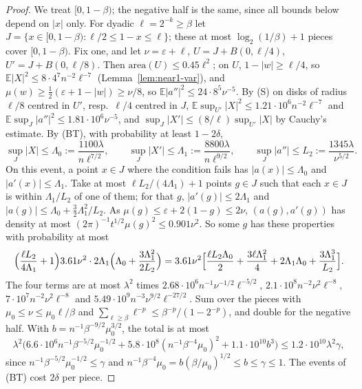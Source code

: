 \documentclass[11pt]{amsart}
\theoremstyle{definition}
\theoremstyle{remark}
\numberwithin{equation}{section}
\newcommand{\E}{\mathbb{E}}
\newcommand{\eps}{\varepsilon}
\begin{document}
\begin{proof}
We treat $[0,1-\beta)$; the negative half is the same, since all bounds below depend on $|x|$ only. For dyadic $\ell=2^{-k}\ge\beta$ let $J=\{x\in[0,1-\beta):\ell/2\le1-x\le\ell\}$; these at most $\log_2(1/\beta)+1$ pieces cover $[0,1-\beta)$. Fix one, and let $\nu=\eps+\ell$, $U=J+B(0,\ell/4)$, $U'=J+B(0,\ell/8)$. Then $\mathrm{area}(U)\le0.45\ell^2$; on $U$, $1-|w|\ge\ell/4$, so $\E|X|^2\le8\cdot4^7n^{-2}\ell^{-7}$ (Lemma~\ref{lem:near1-var}), and $\mu(w)\ge\frac12(\eps+1-|w|)\ge\nu/8$, so $\E|a''|^2\le24\cdot8^5\nu^{-5}$. By (S) on disks of radius $\ell/8$ centred in $U'$, resp.\ $\ell/4$ centred in $J$, $\E\sup_{U'}|X|^2\le1.21\cdot10^6n^{-2}\ell^{-7}$ and $\E\sup_J|a''|^2\le1.81\cdot10^6\nu^{-5}$, and $\sup_J|X'|\le(8/\ell)\sup_{U'}|X|$ by Cauchy's estimate. By (BT), with probability at least $1-2\delta$,
\[
\sup_J|X|\le\Lambda_0:=\frac{1100\lambda}{n\ell^{7/2}},\qquad\sup_J|X'|\le\Lambda_1:=\frac{8800\lambda}{n\ell^{9/2}},\qquad\sup_J|a''|\le L_2:=\frac{1345\lambda}{\nu^{5/2}}.
\]
On this event, a point $x\in J$ where the condition fails has $|a(x)|\le\Lambda_0$ and $|a'(x)|\le\Lambda_1$. Take at most $\ell L_2/(4\Lambda_1)+1$ points $g\in J$ such that each $x\in J$ is within $\Lambda_1/L_2$ of one of them; for that $g$, $|a'(g)|\le2\Lambda_1$ and $|a(g)|\le\Lambda_0+\frac32\Lambda_1^2/L_2$. As $\mu(g)\le\eps+2(1-g)\le2\nu$, $(a(g),a'(g))$ has density at most $(2\pi)^{-1}t^{1/2}\mu(g)^2\le0.901\nu^2$. So some $g$ has these properties with probability at most
\[
\Bigl(\frac{\ell L_2}{4\Lambda_1}+1\Bigr)3.61\nu^2\cdot2\Lambda_1\Bigl(\Lambda_0+\frac{3\Lambda_1^2}{2L_2}\Bigr)
=3.61\nu^2\Bigl[\frac{\ell L_2\Lambda_0}2+\frac{3\ell\Lambda_1^2}4+2\Lambda_1\Lambda_0+\frac{3\Lambda_1^3}{L_2}\Bigr].
\]
The four terms are at most $\lambda^2$ times $2.68\cdot10^6n^{-1}\nu^{-1/2}\ell^{-5/2}$, $2.1\cdot10^8n^{-2}\nu^2\ell^{-8}$, $7\cdot10^7n^{-2}\nu^2\ell^{-8}$ and $5.49\cdot10^9n^{-3}\nu^{9/2}\ell^{-27/2}$. Sum over the pieces with $\mu_0\le\nu\le\mu_0\ell/\beta$ and $\sum_{\ell\ge\beta}\ell^{-p}\le\beta^{-p}/(1-2^{-p})$, and double for the negative half. With $b=n^{-1}\beta^{-9/2}\mu_0^{3/2}$, the total is at most
\[
\lambda^2\bigl(6.6\cdot10^6n^{-1}\beta^{-5/2}\mu_0^{-1/2}+5.8\cdot10^8(n^{-1}\beta^{-4}\mu_0)^2+1.1\cdot10^{10}b^3\bigr)\le1.2\cdot10^{10}\lambda^2\gamma,
\]
since $n^{-1}\beta^{-5/2}\mu_0^{-1/2}\le\gamma$ and $n^{-1}\beta^{-4}\mu_0=b(\beta/\mu_0)^{1/2}\le b\le\gamma\le1$. The events of (BT) cost $2\delta$ per piece.
\end{proof}
\end{document}
